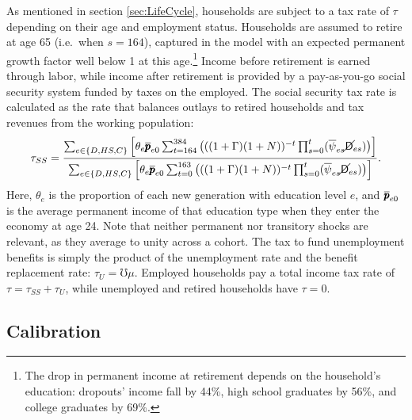 \documentclass[12pt,titlepage]{econtex}
\renewcommand{\urate}{\ensuremath{\mho}}
\begin{document}
As mentioned in section \ref{sec:LifeCycle}, households are subject to a tax rate of $\tau$ depending on their age and employment status.  Households are assumed to retire at age 65 (i.e.\ when $s = 164$), captured in the model with an expected permanent growth factor well below 1 at this age.\footnote{The drop in permanent income at retirement depends on the household's education: dropouts' income fall by 44\%, high school graduates by 56\%, and college graduates by 69\%.}  Income before retirement is earned through labor, while income after retirement is provided by a pay-as-you-go social security system funded by taxes on the employed.  The social security tax rate is calculated as the rate that balances outlays to retired households and tax revenues from the working population:
\begin{equation*}
\tau_{SS} = \frac{\sum_{e \in \{D,HS,C\}} \Big[ \theta_e \overline{\pmb{p}}_{e0} \sum_{t = 164}^{384} \big( ((1 + \Gamma)(1+N))^{-t} \prod_{s=0}^t ( \overline{\psi}_{es} \cancel{\mathsf{D}}_{es} ) \big) \Big]}
{\sum_{e \in \{D,HS,C\}} \Big[ \theta_e \overline{\pmb{p}}_{e0} \sum_{t = 0}^{163} \big( ((1 + \Gamma)(1+N) )^{-t} \prod_{s=0}^t ( \overline{\psi}_{es} \cancel{\mathsf{D}}_{es} ) \big) \Big]}.
\end{equation*}
Here, $\theta_e$ is the proportion of each new generation with education level $e$, and $\overline{\pmb{p}}_{e0}$ is the average permanent income of that education type when they enter the economy at age 24.  Note that neither permanent nor transitory shocks are relevant, as they average to unity across a cohort.  The tax to fund unemployment benefits is simply the product of the unemployment rate and the benefit replacement rate: $\tau_U = \urate \mu$.  Employed households pay a total income tax rate of $\tau = \tau_{SS} + \tau_U$, while unemployed and retired households have $\tau = 0$.

\subsection{Calibration}
\end{document}
